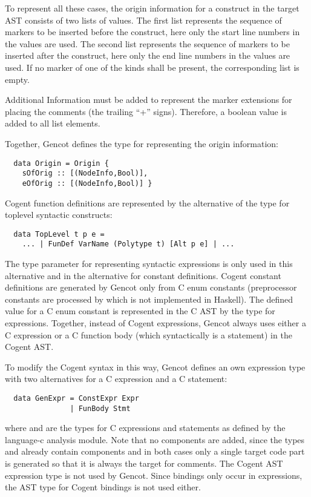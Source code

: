 To represent all these cases, the origin information for a construct in the target AST consists of two lists of 
values. The first list represents the sequence of  markers to be inserted before the construct, here only the
start line numbers in the  values are used. The second list represents the sequence of  markers 
to be inserted after the construct, here only the end line numbers in the  values are used. If no marker of
one of the kinds shall be present, the corresponding list is empty.

Additional Information must be added to represent the marker extensions for placing the comments (the trailing ``+'' signs).
Therefore, a boolean value is added to all list elements.

Together, Gencot defines the type  for representing the origin information:
\begin{verbatim}
  data Origin = Origin { 
    sOfOrig :: [(NodeInfo,Bool)], 
    eOfOrig :: [(NodeInfo,Bool)] } 
\end{verbatim}

Cogent function definitions are represented by the  alternative of the type for toplevel syntactic constructs:

\begin{verbatim}
  data TopLevel t p e = 
    ... | FunDef VarName (Polytype t) [Alt p e] | ...
\end{verbatim}
The type parameter  for representing syntactic expressions is only used in this alternative and in the alternative
for constant definitions. Cogent constant definitions are generated by Gencot only from C enum constants (preprocessor
constants are processed by  which is not implemented in Haskell). The defined value for a C enum
constant is represented in the C AST by the type for expressions. Together, instead of Cogent expressions, Gencot always
uses either a C expression or a C function body (which syntactically is a statement) in the Cogent AST. 

To modify the Cogent syntax in this way, Gencot defines an own expression type with two alternatives for a C expression 
and a C statement:
\begin{verbatim}
  data GenExpr = ConstExpr Expr
               | FunBody Stmt
\end{verbatim}
where  and  are the types for C expressions and statements as defined by the language-c analysis
module. Note that no  components are added, since the types  and  already contain
 components and in both cases only a single target code part is generated so that it is always the
target for comments. The Cogent AST expression type is not used by Gencot. Since bindings only occur in expressions,
the AST type for Cogent bindings is not used either.

